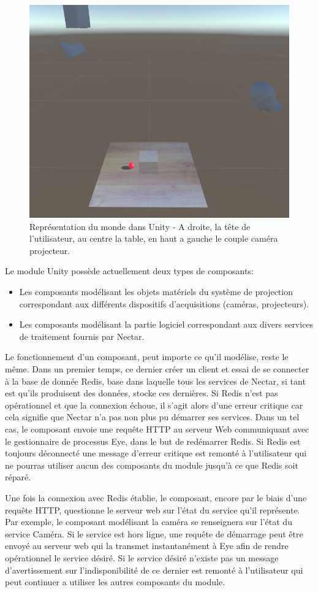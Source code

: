 \begin{figure}[ht]
\centering
\includegraphics[width=0.65\linewidth]{images/unityscene}
\caption{Représentation du monde dans Unity - A droite, la tête de l'utilisateur, au centre la table, en haut a gauche le couple caméra projecteur.}
\label{fig:unityrealworld}
\end{figure}

Le module Unity possède actuellement deux types de composants:
\begin{itemize}
\item Les composants modélisant les objets matériels du système de projection correspondant aux différents dispositifs d'acquisitions (caméras, projecteurs).
\item Les composants modélisant la partie logiciel correspondant aux divers services de traitement fournis par Nectar.
\end{itemize}

Le fonctionnement d'un composant, peut importe ce qu'il modélise, reste le même. Dans un premier temps, ce dernier créer un client et essai de se connecter à la base de donnée Redis, base dans laquelle tous les services de Nectar, si tant est qu'ils produisent des données, stocke ces dernières. Si Redis n'est pas opérationnel et que la connexion échoue, il s'agit alors d'une erreur critique car cela signifie que Nectar n'a pas non plus pu démarrer ses services. Dans un tel cas, le composant envoie une requête HTTP au serveur Web communiquant avec le gestionnaire de processus Eye, dans le but de redémarrer Redis. Si Redis est toujours déconnecté une message d'erreur critique est remonté à l'utilisateur qui ne pourras utiliser aucun des composants du module jusqu'à ce que Redis soit réparé.

Une fois la connexion avec Redis établie, le composant, encore par le biais d'une requête HTTP, questionne le serveur web sur l'état du service qu'il représente. Par exemple, le composant modélisant la caméra se renseignera sur l'état du service Caméra. Si le service est hors ligne, une requête de démarrage peut être envoyé au serveur web qui la transmet instantanément à Eye afin de rendre opérationnel le service désiré. Si le service désiré n'existe pas un message d'avertissement sur l'indisponibilité de ce dernier est remonté à l'utilisateur qui peut continuer a utiliser les autres composants du module.

